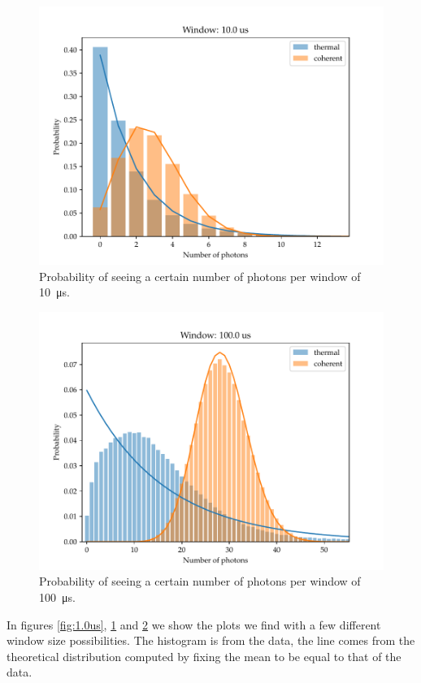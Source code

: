 \documentclass[main.tex]{subfiles}
\begin{document}
\begin{figure}[ht]
\centering
\includegraphics[width=\textwidth]{figures/10.0us}
\caption{Probability of seeing a certain number of photons per window of \SI{10}{\micro s}.}
\label{fig:10.0us}
\end{figure}

\begin{figure}[ht]
\centering
\includegraphics[width=\textwidth]{figures/100.0us}
\caption{Probability of seeing a certain number of photons per window of \SI{100}{\micro s}.}
\label{fig:100.0us}
\end{figure}

In figures \ref{fig:1.0us}, \ref{fig:10.0us} and \ref{fig:100.0us} we show the plots we find with a few different window size possibilities.
The histogram is from the data, the line comes from the theoretical distribution computed by fixing the mean to be equal to that of the data.
\end{document}
